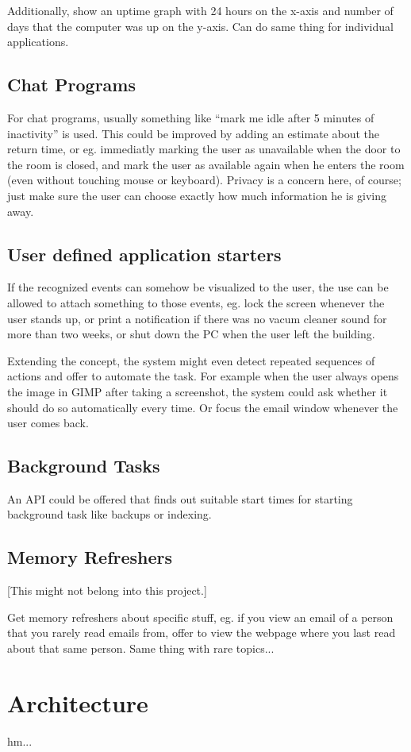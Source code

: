 \documentclass[]{article}
\begin{document}
Additionally, show an uptime graph with 24 hours on the x-axis and
number of days that the computer was up on the y-axis. Can do same
thing for individual applications.

\subsection{Chat Programs}
For chat programs, usually something like ``mark me idle after 5
minutes of inactivity'' is used. This could be improved by adding an
estimate about the return time, or eg. immediatly marking the user as
unavailable when the door to the room is closed, and mark the user as
available again when he enters the room (even without touching mouse
or keyboard). Privacy is a concern here, of course; just make sure the
user can choose exactly how much information he is giving away.

\subsection{User defined application starters}
If the recognized events can somehow be visualized to the user, the
use can be allowed to attach something to those events, eg. lock the
screen whenever the user stands up, or print a notification if there
was no vacum cleaner sound for more than two weeks, or shut down the
PC when the user left the building.

Extending the concept, the system might even detect repeated sequences
of actions and offer to automate the task. For example when the user
always opens the image in GIMP after taking a screenshot, the system
could ask whether it should do so automatically every time. Or focus
the email window whenever the user comes back.

\subsection{Background Tasks}
An API could be offered that finds out suitable start times for
starting background task like backups or indexing.

\subsection{Memory Refreshers}

[This might not belong into this project.]

Get memory refreshers about specific stuff, eg. if you view an email
of a person that you rarely read emails from, offer to view the
webpage where you last read about that same person. Same thing with
rare topics...

\section{Architecture}
hm...
\end{document}
